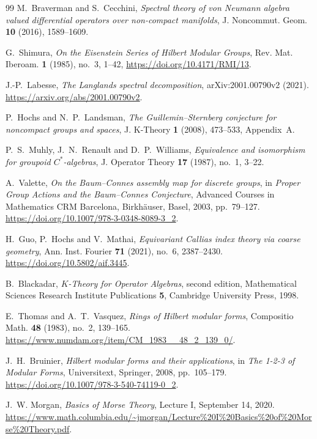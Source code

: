\documentclass[11pt]{article}
\theoremstyle{definition}
\theoremstyle{plain}
\numberwithin{equation}{section}
\begin{document}
\begin{thebibliography}{99}
M.~Braverman and S.~Cecchini,
\emph{Spectral theory of von Neumann algebra valued differential
operators over non-compact manifolds},
J. Noncommut. Geom. \textbf{10} (2016), 1589--1609.

G.~Shimura, \emph{On the Eisenstein Series of Hilbert Modular Groups},
Rev. Mat. Iberoam. \textbf{1} (1985), no.~3, 1--42,
\url{https://doi.org/10.4171/RMI/13}.

J.-P.~Labesse, \emph{The Langlands spectral decomposition},
arXiv:2001.00790v2 (2021).
\url{https://arxiv.org/abs/2001.00790v2}.

P.~Hochs and N.~P.~Landsman,
\emph{The Guillemin--Sternberg conjecture for noncompact groups and spaces},
J. K-Theory \textbf{1} (2008), 473--533, Appendix~A.

P.~S.~Muhly, J.~N.~Renault and D.~P.~Williams,
\emph{Equivalence and isomorphism for groupoid $C^*$-algebras},
J. Operator Theory \textbf{17} (1987), no.~1, 3--22.

A.~Valette,
\emph{On the Baum--Connes assembly map for discrete groups},
in \emph{Proper Group Actions and the Baum--Connes Conjecture},
Advanced Courses in Mathematics CRM Barcelona,
Birkh\"auser, Basel, 2003, pp.~79--127.
\url{https://doi.org/10.1007/978-3-0348-8089-3_2}.

H.~Guo, P.~Hochs and V.~Mathai,
\emph{Equivariant Callias index theory via coarse geometry},
Ann. Inst. Fourier \textbf{71} (2021), no.~6, 2387--2430.
\url{https://doi.org/10.5802/aif.3445}.

B.~Blackadar, \emph{$K$-Theory for Operator Algebras},
second edition, Mathematical Sciences Research Institute
Publications \textbf{5}, Cambridge University Press, 1998.


E.~Thomas and A.~T.~Vasquez,
\emph{Rings of Hilbert modular forms},
Compositio Math. \textbf{48} (1983),
no.~2, 139--165.
\url{https://www.numdam.org/item/CM_1983__48_2_139_0/}.

J.~H.~Bruinier,
\emph{Hilbert modular forms and their applications},
in \emph{The 1-2-3 of Modular Forms},
Universitext, Springer, 2008, pp.~105--179.
\url{https://doi.org/10.1007/978-3-540-74119-0_2}.


J.~W. Morgan,
\emph{Basics of Morse Theory},
Lecture I, September 14, 2020.
\url{https://www.math.columbia.edu/~jmorgan/Lecture%20I%20Basics%20of%20Morse%20Theory.pdf}.


\end{thebibliography}
\end{document}
